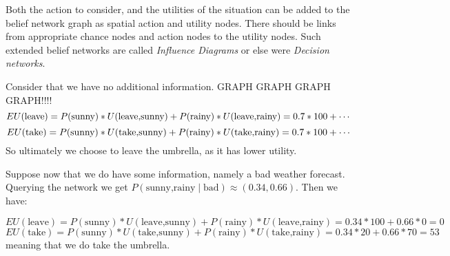  {
     Both the action to consider, and the utilities of the situation can be added to the belief network graph as spatial action and utility nodes. There should be links from appropriate chance nodes and action nodes to the utility nodes.
     Such extended belief networks are called \textit{Influence Diagrams} or else were  \textit{Decision networks}.
     {
         Consider that we have no additional information.
         GRAPH GRAPH GRAPH GRAPH!!!! 
         \begin{equation}
             EU(\text{leave}) = P(\text{sunny})*U(\text{leave,sunny})+P(\text{rainy})*U(\text{leave,rainy}) = \\
             0.7*100+\cdots 

         \end{equation}
         \begin{equation}
             EU(\text{take}) = P(\text{sunny})*U(\text{take,sunny})+P(\text{rainy})*U(\text{take,rainy}) = \\
             0.7*100+\cdots 

             
         \end{equation}
         So ultimately we choose to leave the umbrella, as it has lower utility.

         Suppose now that we do have some information, namely a bad weather forecast. Querying the network we get $P(\text{sunny,rainy}\mid \text{bad}) \approx (0.34,0.66)$. Then we have: %

         \begin{equation}
             EU(\text{leave}) = P(\text{sunny})*U(\text{leave,sunny})+P(\text{rainy})*U(\text{leave,rainy}) = 0.34*100+0.66*0=0
         \end{equation}
         \begin{equation}
             EU(\text{take}) = P(\text{sunny})*U(\text{take,sunny})+P(\text{rainy})*U(\text{take,rainy}) = 0.34*20+0.66*70=53
         \end{equation}
         meaning that we do take the umbrella.
     }
 
 }




